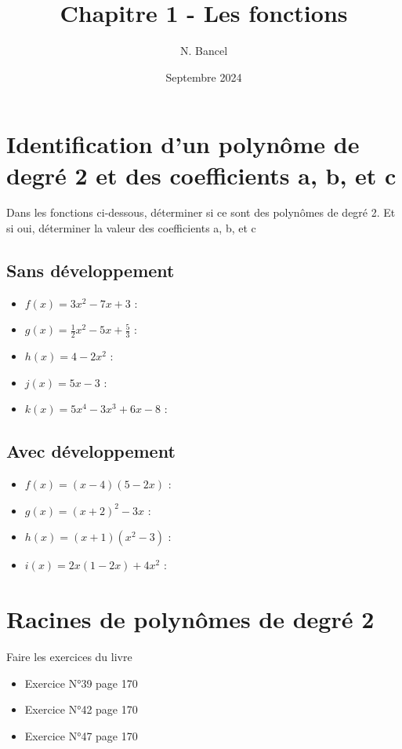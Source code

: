 \documentclass[a4paper,12pt]{article}
\begin{document}
\def\WITH_CORRECTION{NO}

\title{Chapitre 1 - Les fonctions}
\author{N. Bancel}
\date{Septembre 2024}
\maketitle

\section{Identification d'un polynôme de degré 2 et des coefficients a, b, et c}

Dans les fonctions ci-dessous, déterminer si ce sont des polynômes de degré 2. Et si oui, déterminer la valeur des coefficients a, b, et c

\subsection{Sans développement}

\begin{itemize}
  \item \(f(x) = 3 x^2 - 7x + 3\) : 
  \item \(g(x) = \frac{1}{2} x^2 - 5x + \frac{5}{3}\) : 
  \item \(h(x) = 4 - 2 x^2\) :
  \item \(j(x) = 5x - 3\) : 
  \item \(k(x) = 5x^4 - 3x^3 + 6x - 8\) : 
\end{itemize}

\subsection{Avec développement}

\begin{itemize}
  \item \(f(x) = (x - 4)(5 - 2x)\) : 
  \vspace{1em}
  \item \(g(x) = (x + 2)^2 - 3x\) : 
  \vspace{1em}
  \item \(h(x) = (x + 1)(x^2 - 3)\) :
  \vspace{1em}
  \item \(i(x) = 2x (1 - 2x) + 4x^2\) :
\end{itemize}

\section{Racines de polynômes de degré 2}

Faire les exercices du livre 

\begin{itemize}
  \item Exercice N°39 page 170
  \item Exercice N°42 page 170
  \item Exercice N°47 page 170
\end{itemize}
\end{document}
